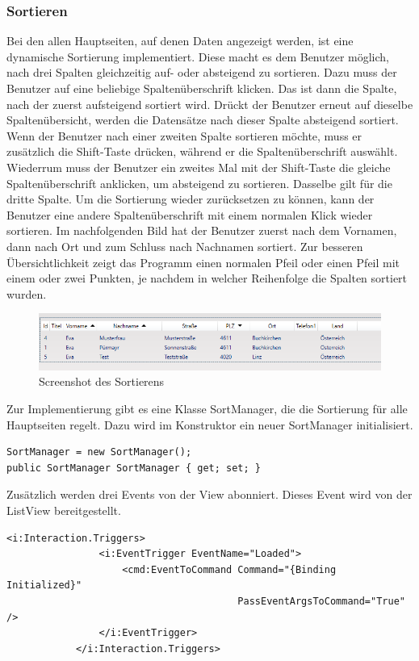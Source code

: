 \subsubsection{Sortieren}
Bei den allen Hauptseiten, auf denen Daten angezeigt werden, ist eine dynamische Sortierung implementiert. Diese macht es dem Benutzer möglich, nach drei Spalten gleichzeitig auf- oder absteigend zu sortieren.  Dazu muss der Benutzer auf eine beliebige Spaltenüberschrift klicken. Das ist dann die Spalte, nach der zuerst aufsteigend sortiert wird. Drückt der Benutzer erneut auf dieselbe Spaltenübersicht, werden die Datensätze nach dieser Spalte absteigend sortiert. Wenn der Benutzer nach einer zweiten Spalte sortieren möchte, muss er zusätzlich die Shift-Taste drücken, während er die Spaltenüberschrift auswählt. Wiederrum muss der Benutzer ein zweites Mal mit der Shift-Taste die gleiche Spaltenüberschrift anklicken, um absteigend zu sortieren. Dasselbe gilt für die dritte Spalte. Um die Sortierung wieder zurücksetzen zu können, kann der Benutzer eine andere Spaltenüberschrift mit einem normalen Klick wieder sortieren. Im nachfolgenden Bild hat der Benutzer zuerst nach dem Vornamen, dann nach Ort und zum Schluss nach Nachnamen sortiert. Zur besseren Übersichtlichkeit zeigt das Programm einen normalen Pfeil oder einen Pfeil mit einem oder zwei Punkten, je nachdem in welcher Reihenfolge die Spalten sortiert wurden.
\begin{figure}[H]
\begin{center}
	\includegraphics[scale=0.75]{images/Sortieren.png}
\end{center}
	\caption{Screenshot des Sortierens}
	\label{fig:sample}
\end{figure}
Zur Implementierung gibt es eine Klasse SortManager, die die Sortierung für alle Hauptseiten regelt. Dazu wird im Konstruktor ein neuer SortManager initialisiert.
\begin{lstlisting}
SortManager = new SortManager();
public SortManager SortManager { get; set; }
\end{lstlisting}
Zusätzlich werden drei Events von der View abonniert. Dieses Event wird von der ListView bereitgestellt.
\begin{lstlisting}
<i:Interaction.Triggers>
                <i:EventTrigger EventName="Loaded">
                    <cmd:EventToCommand Command="{Binding Initialized}"
                                        PassEventArgsToCommand="True" />
                </i:EventTrigger>
            </i:Interaction.Triggers>
\end{lstlisting}

